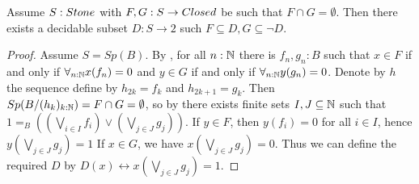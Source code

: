 \begin{lemma}\label{StoneSeperated}
  Assume $S:\Stone $ with $F,G:S \to \Closed$ be such that $F\cap G = \emptyset$. 
  Then there exists a decidable subset $D:S \to 2$ such $F\subseteq D, G \subseteq \neg D$. 
\end{lemma}
\begin{proof}
  Assume $S = Sp(B)$. 
  By , for all $n:\mathbb{N}$ there is $f_n,g_n:B$ such that 
  $x\in F$ if and only if $\forall_{n:\mathbb{N}}x(f_n) = 0$ and 
  $y\in G$ if and only if $\forall_{n:\mathbb{N}}y(g_n) = 0$.
%
  Denote by $h$ the sequence define by $h_{2k}=f_k$ and $h_{2k+1}=g_k$.
Then $Sp(B/(h_k)_{k:\mathbb{N}}) = F \cap G=\emptyset$, so by 
%
  there exists finite sets $I,J\subseteq \mathbb{N} $ such that 
  $1 =_B ((\bigvee_{i\in I}  f_i) \vee (\bigvee_{j\in J}  g_j)).$
%
  If $y\in F$, then $y(f_i) = 0$ for all $i\in I$, hence
  $y(\bigvee_{j\in J} g_j) = 1 $
 If $x\in G$, we have 
  $x(\bigvee_{j\in J} g_j) = 0$. 
  Thus we can define the required $D$ by 
  $D(x) \leftrightarrow x(\bigvee_{j\in J} g_j) = 1$.
\end{proof} 

